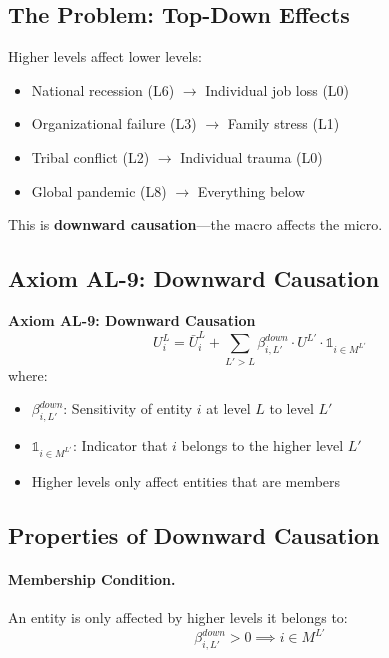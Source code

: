 \subsection{The Problem: Top-Down Effects}

Higher levels affect lower levels:
\begin{itemize}
\item National recession (L6) $\to$ Individual job loss (L0)
\item Organizational failure (L3) $\to$ Family stress (L1)
\item Tribal conflict (L2) $\to$ Individual trauma (L0)
\item Global pandemic (L8) $\to$ Everything below
\end{itemize}

This is \textbf{downward causation}---the macro affects the micro.

\subsection{Axiom AL-9: Downward Causation}

\begin{tcolorbox}[colback=gray!5!white, colframe=gray!75!black]
\textbf{Axiom AL-9: Downward Causation}
\begin{equation}
\boxed{
U^L_i = \bar{U}^L_i + \sum_{L' > L} \beta^{down}_{i,L'} \cdot U^{L'} \cdot \mathbb{1}_{i \in M^{L'}}
}
\end{equation}
where:
\begin{itemize}
\item $\beta^{down}_{i,L'}$: Sensitivity of entity $i$ at level $L$ to level $L'$
\item $\mathbb{1}_{i \in M^{L'}}$: Indicator that $i$ belongs to the higher level $L'$
\item Higher levels only affect entities that are members
\end{itemize}
\end{tcolorbox}

\subsection{Properties of Downward Causation}

\paragraph{Membership Condition.}
An entity is only affected by higher levels it belongs to:
\begin{equation}
\beta^{down}_{i,L'} > 0 \implies i \in M^{L'}
\end{equation}

